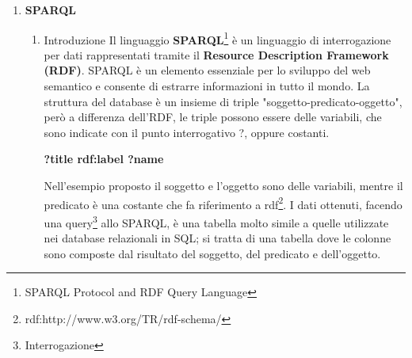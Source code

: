 \documentclass[a4paper,11pt]{article}
\begin{document}
\begin{enumerate}
\begin{enumerate}[label*=\arabic*.]
\begin{figure}[htb]
\begin{lstlisting}[language=HTML, basicstyle=\large]
<body>		
<div id='map'>
<script type="text/javascript">
var map=L.map('map')setView([37.583,14.071],9);
L.tileLayer('https://{s}.tiles.mapbox.com/v3/{id}/{z}/{x}/{y}.png',{
        maxZoom: 18,
        attribution: 'Map data &copy; 
  <a href="http://openstreetmap.org">OpenStreetMap</a> contributors,'+
 '<a href="http://creativecommons.org/licenses/by-sa/2.0/">CC-BY-SA</a>,'+
	'Imagery c <a href="http://mapbox.com">Mapbox</a>',
	id: 'andreacostazza.ik9ap86i'
	}).addTo(map);
var iconBlue= L.icon({
	iconUrl: './icon/marker-icon.png',
	shadowUrl: './icon/marker-shadow.png',
			
	iconSize: [25,41],
	shadowSize: [41,41],
	iconAnchor:[lat,lon],
	shadowAnchor:[lat,lon],
	popupAnchor:[-25,-10]
	});
	
	var marker = L.marker([lat, lon],{icon:iconBlue});		
	marker.addTo(map);
</script>
</div>
</body>
\end{lstlisting}
\end{figure}
		\end{enumerate}
	\newpage
	\item \LARGE{\textbf{SPARQL}}
		\begin{enumerate}[label*=\arabic*.]
			\Large			
			\item {Introduzione}\newline
Il linguaggio \textbf{SPARQL}\footnote{SPARQL Protocol and RDF Query Language} è un linguaggio di interrogazione per dati rappresentati tramite il \textbf{Resource Description Framework (RDF)}.
SPARQL è un elemento essenziale per lo sviluppo del web semantico e consente di estrarre informazioni in tutto il mondo.\newline 
La struttura del database è un insieme di triple "soggetto-predicato-oggetto", però a differenza dell'RDF, le triple possono essere delle variabili, che sono indicate con il punto interrogativo ?, oppure costanti.

\begin{center}	
	\textbf{?title rdf:label ?name}
\end{center}

Nell'esempio proposto il soggetto e l'oggetto sono delle variabili, mentre il predicato è una costante che fa riferimento a rdf\footnote{rdf:http://www.w3.org/TR/rdf-schema/}.\newline
I dati ottenuti, facendo una query\footnote{Interrogazione} allo SPARQL, è una tabella molto simile a quelle utilizzate nei database relazionali in SQL; si tratta di una tabella dove le colonne sono composte dal risultato del soggetto, del predicato e dell'oggetto. 


\end{enumerate}
\end{enumerate}
\end{document}
